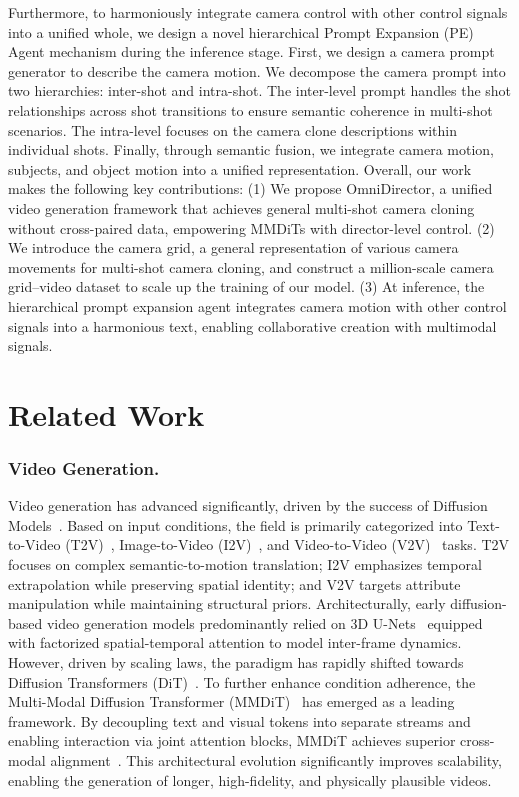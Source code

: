 \documentclass{llmxive}
\begin{document}
Furthermore, to harmoniously integrate camera control with other control signals into a unified whole, we design a novel hierarchical Prompt Expansion (PE) Agent mechanism during the inference stage. First, we design a camera prompt generator to describe the camera motion. We decompose the camera prompt into two hierarchies: inter-shot and intra-shot. The inter-level prompt handles the shot relationships across shot transitions to ensure semantic coherence in multi-shot scenarios. The intra-level focuses on the camera clone descriptions within individual shots. Finally, through semantic fusion, we integrate camera motion, subjects, and object motion into a unified representation.
Overall, our work makes the following key contributions: 
(1) We propose OmniDirector, a unified video generation framework that achieves general multi-shot camera cloning without cross-paired data, empowering MMDiTs with director-level control.
(2) We introduce the camera grid, a general representation of various camera movements for multi-shot camera cloning, and construct a million-scale camera grid–video dataset to scale up the training of our model.
(3) At inference, the hierarchical prompt expansion agent integrates camera motion with other control signals into a harmonious text, enabling collaborative creation with multimodal signals.
\vspace{-0.5cm}
\section{Related Work}
\subsubsection{Video Generation.} Video generation has advanced significantly, driven by the success of Diffusion Models~\cite{ho2020denoising, ho2022video, ho2022imagen}. Based on input conditions, the field is primarily categorized into Text-to-Video (T2V)~\cite{singer2022make, villegas2023phenaki, bar2024lumiere, polyak2024movie}, Image-to-Video (I2V)~\cite{zhang2023i2vgen, xing2024dynamicrafter, chen2023seine, renconsisti2v}, and Video-to-Video (V2V)~\cite{wang2023videocomposer} tasks. T2V focuses on complex semantic-to-motion translation; I2V emphasizes temporal extrapolation while preserving spatial identity; and V2V targets attribute manipulation while maintaining structural priors.
Architecturally, early diffusion-based video generation models predominantly relied on 3D U-Nets~\cite{ho2022video, ho2022imagen, singer2022make, blattmann2023stable} equipped with factorized spatial-temporal attention to model inter-frame dynamics. However, driven by scaling laws, the paradigm has rapidly shifted towards Diffusion Transformers (DiT)~\cite{peebles2023scalable, malatte}. To further enhance condition adherence, the Multi-Modal Diffusion Transformer (MMDiT)~\cite{esser2024scaling} has emerged as a leading framework. By decoupling text and visual tokens into separate streams and enabling interaction via joint attention blocks, MMDiT achieves superior cross-modal alignment~\cite{polyak2024movie}. This architectural evolution significantly improves scalability, enabling the generation of longer, high-fidelity, and physically plausible videos. 
\end{document}
